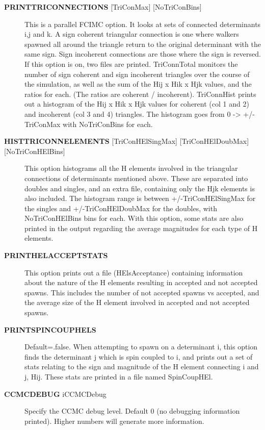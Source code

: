 \documentclass[openany,a4paper,10pt,english]{manual}
\begin{document}
\begin{description}
\item[\textbf{PRINTTRICONNECTIONS} {[}TriConMax{]} {[}NoTriConBins{]}] \leavevmode
This is a parallel FCIMC option. It looks at sets of connected determinants i,j and k.  A sign coherent
triangular connection is one where walkers spawned all around the triangle return to the original
determinant with the same sign.  Sign incoherent connections are those where the sign is reversed.
If this option is on, two files are printed.  TriConnTotal monitors the number of sign coherent and sign
incoherent triangles over the course of the simulation, as well as the sum of the Hij x Hik x Hjk values,
and the ratios for each.  (The ratios are coherent / incoherent).  TriConnHist prints out a histogram of
the Hij x Hik x Hjk values for coherent (col 1 and 2) and incoherent (col 3 and 4) triangles.  The histogram
goes from 0 -\textgreater{} +/- TriConMax with NoTriConBins for each.

\item[\textbf{HISTTRICONNELEMENTS} {[}TriConHElSingMax{]} {[}TriConHElDoubMax{]} {[}NoTriConHElBins{]}] \leavevmode
This option histograms all the H elements involved in the triangular connections of determinants mentioned
above.  These are separated into doubles and singles, and an extra file, containing only the Hjk elements is
also included.
The histogram range is between +/-TriConHElSingMax for the singles and +/-TriConHElDoubMax for the doubles, with
NoTriConHElBins bins for each.
With this option, some stats are also printed in the output regarding the average magnitudes for each type of H
elements.

\item[\textbf{PRINTHELACCEPTSTATS}] \leavevmode
This option prints out a file (HElsAcceptance) containing information about the nature of the H elements
resulting in accepted and not accepted spawns.  This includes the number of not accepted spawns vs accepted,
and the average size of the H element involved in accepted and not accepted spawns.

\item[\textbf{PRINTSPINCOUPHELS}] \leavevmode
Default=.false.
When attempting to spawn on a determinant i, this option finds the determinant j which is spin coupled to i, and
prints out a set of stats relating to the sign and magnitude of the H element connecting i and j, Hij.
These stats are printed in a file named SpinCoupHEl.

\item[\textbf{CCMCDEBUG} iCCMCDebug] \leavevmode
Specify the CCMC debug level.  Default 0 (no debugging information printed).  Higher numbers will generate more
information.


\end{description}
\end{document}
